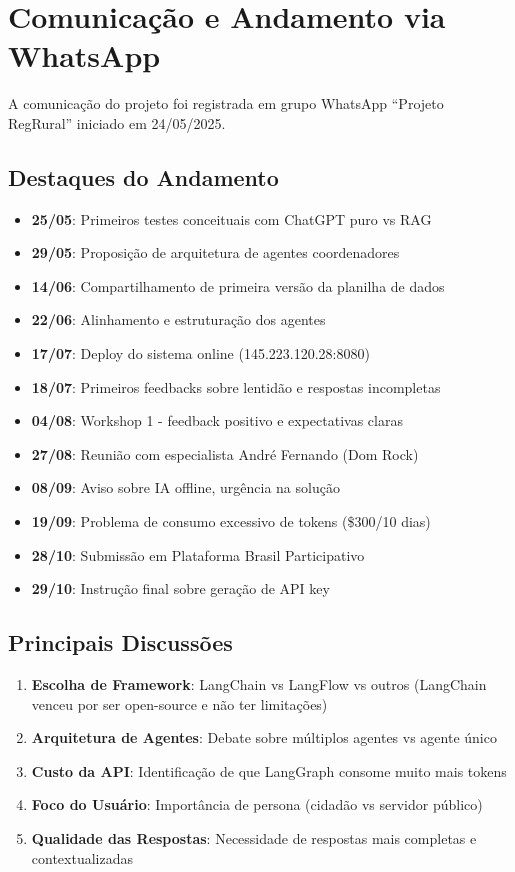 \documentclass[12pt,a4paper]{report}
\begin{document}
\section{Comunicação e Andamento via WhatsApp}

A comunicação do projeto foi registrada em grupo WhatsApp ``Projeto RegRural'' iniciado em 24/05/2025.

\subsection{Destaques do Andamento}

\begin{itemize}
  \item \textbf{25/05}: Primeiros testes conceituais com ChatGPT puro vs RAG
  \item \textbf{29/05}: Proposição de arquitetura de agentes coordenadores
  \item \textbf{14/06}: Compartilhamento de primeira versão da planilha de dados
  \item \textbf{22/06}: Alinhamento e estruturação dos agentes
  \item \textbf{17/07}: Deploy do sistema online (145.223.120.28:8080)
  \item \textbf{18/07}: Primeiros feedbacks sobre lentidão e respostas incompletas
  \item \textbf{04/08}: Workshop 1 - feedback positivo e expectativas claras
  \item \textbf{27/08}: Reunião com especialista André Fernando (Dom Rock)
  \item \textbf{08/09}: Aviso sobre IA offline, urgência na solução
  \item \textbf{19/09}: Problema de consumo excessivo de tokens (\$300/10 dias)
  \item \textbf{28/10}: Submissão em Plataforma Brasil Participativo
  \item \textbf{29/10}: Instrução final sobre geração de API key
\end{itemize}

\subsection{Principais Discussões}

\begin{enumerate}
  \item \textbf{Escolha de Framework}: LangChain vs LangFlow vs outros (LangChain venceu por ser open-source e não ter limitações)
  \item \textbf{Arquitetura de Agentes}: Debate sobre múltiplos agentes vs agente único
  \item \textbf{Custo da API}: Identificação de que LangGraph consome muito mais tokens
  \item \textbf{Foco do Usuário}: Importância de persona (cidadão vs servidor público)
  \item \textbf{Qualidade das Respostas}: Necessidade de respostas mais completas e contextualizadas
\end{enumerate}
\end{document}
